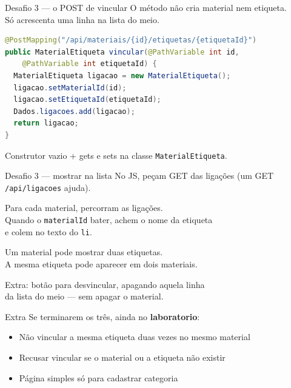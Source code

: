 \documentclass[aspectratio=169,11pt]{beamer}
\begin{document}
\begin{frame}[fragile]{Desafio 3 --- o POST de vincular}
  O método não cria material nem etiqueta.\\
  Só acrescenta uma linha na lista do meio.

\begin{lstlisting}[language=Java,basicstyle=\ttfamily\scriptsize]
@PostMapping("/api/materiais/{id}/etiquetas/{etiquetaId}")
public MaterialEtiqueta vincular(@PathVariable int id,
    @PathVariable int etiquetaId) {
  MaterialEtiqueta ligacao = new MaterialEtiqueta();
  ligacao.setMaterialId(id);
  ligacao.setEtiquetaId(etiquetaId);
  Dados.ligacoes.add(ligacao);
  return ligacao;
}
\end{lstlisting}

  Construtor vazio + gets e sets na classe
  \texttt{MaterialEtiqueta}.
\end{frame}

\begin{frame}{Desafio 3 --- mostrar na lista}
  No JS, peçam GET das ligações (um GET
  \texttt{/api/ligacoes} ajuda).

  \vspace{0.4em}
  Para cada material, percorram as ligações.\\
  Quando o \texttt{materialId} bater, achem o nome da etiqueta\\
  e colem no texto do \texttt{li}.

  \vspace{0.4em}
  Um material pode mostrar duas etiquetas.\\
  A mesma etiqueta pode aparecer em dois materiais.

  \vspace{0.4em}
  Extra: botão para desvincular, apagando aquela linha\\
  da lista do meio --- sem apagar o material.
\end{frame}

\begin{frame}{Extra}
  Se terminarem os três, ainda no \textbf{laboratorio}:

  \vspace{0.4em}
  \begin{itemize}
    \item Não vincular a mesma etiqueta duas vezes
          no mesmo material
    \item Recusar vincular se o material ou a etiqueta
          não existir
    \item Página simples só para cadastrar categoria
  \end{itemize}
\end{frame}
\end{document}
